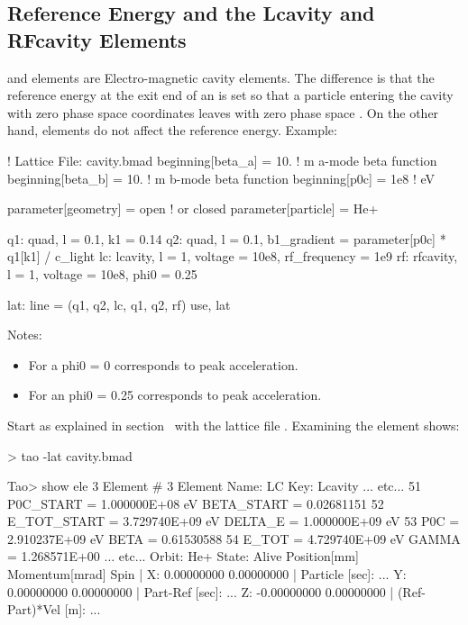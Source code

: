 \documentclass{hitec}
\begin{document}
\subsection{Reference Energy and the Lcavity and RFcavity Elements}

 and  elements are Electro-magnetic cavity elements. The difference is that
the reference energy at the exit end of an  is set so that a particle entering the
cavity with zero phase space coordinates leaves with zero phase space .  On the other hand,
 elements do not affect the reference energy. Example:
\begin{code}
! Lattice File: cavity.bmad
beginning[beta_a] = 10.   ! m  a-mode beta function
beginning[beta_b] = 10.   ! m  b-mode beta function
beginning[p0c] = 1e8   ! eV  

parameter[geometry] = open      ! or closed
parameter[particle] = He+ 

q1: quad, l = 0.1, k1 = 0.14
q2: quad, l = 0.1, b1_gradient = parameter[p0c] * q1[k1] / c_light
lc: lcavity, l = 1, voltage = 10e8, rf_frequency = 1e9
rf: rfcavity, l = 1, voltage = 10e8, phi0 = 0.25

lat: line = (q1, q2, lc, q1, q2, rf)
use, lat
\end{code}

Notes:
\vspace{-10 pt}
\begin{itemize}
\item For a  phi0 = 0 corresponds to peak acceleration.
\item For an  phi0 = 0.25 corresponds to peak acceleration.
\end{itemize}

Start \tao as explained in section~ with the lattice file
. Examining the  element shows:
\begin{code}
> tao -lat cavity.bmad

Tao> show ele 3
Element #                3
Element Name: LC
Key: Lcavity
... etc...
   51   P0C_START    =  1.000000E+08 eV        BETA_START   =  0.02681151
   52   E_TOT_START  =  3.729740E+09 eV        DELTA_E      =  1.000000E+09 eV
   53   P0C          =  2.910237E+09 eV        BETA         =  0.61530588
   54   E_TOT        =  4.729740E+09 eV        GAMMA        =  1.268571E+00
... etc...    
Orbit:  He+   State: Alive
         Position[mm] Momentum[mrad]        Spin   |
  X:       0.00000000     0.00000000               | Particle [sec]:     ...
  Y:       0.00000000     0.00000000               | Part-Ref [sec]:     ...
  Z:      -0.00000000     0.00000000               | (Ref-Part)*Vel [m]: ...
\end{code}
\end{document}
